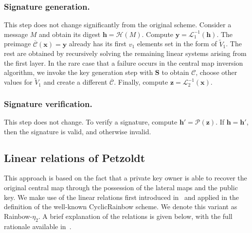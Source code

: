 \documentclass[12pt, a4paper, oneside]{memoir}
\theoremstyle{definition}
\begin{document}
\subsubsection{Signature generation.}

This step does not change significantly from the original scheme. Consider a message $M$ and obtain its digest $\mathbf{h} = \mathcal{H}(M)$. Compute $\mathbf{y} = \mathcal{L}_{1}^{-1}(\mathbf{h})$. The preimage $\overline{\mathcal{C}}(\mathbf{x}) = \mathbf{y}$ already has its first $v_{1}$ elements set in the form of $\widetilde{V}_{1}$. The rest are obtained by recursively solving the remaining linear systems arising from the first layer. In the rare case that a failure occurs in the central map inversion algorithm, we invoke the key generation step with $\mathbf{S}$ to obtain $\mathcal{C}$, choose other values for $\widetilde{V}_{1}$ and create a different $\overline{\mathcal{C}}$. Finally, compute $\mathbf{z} = \mathcal{L}_{2}^{-1}(\mathbf{x})$.

\subsubsection{Signature verification.}

This step does not change. To verify a signature, compute $\mathbf{h'} = \mathcal{P}(\mathbf{z})$. If $\mathbf{h} = \mathbf{h'}$, then the signature is valid, and otherwise invalid.

\subsection{Linear relations of Petzoldt}\label{subsec:linear}

This approach is based on the fact that a private key owner is able to recover the original central map through the possession of the lateral maps and the public key. We make use of the linear relations first introduced in~\cite{Petzoldt:201006} and applied in the definition of the well-known CyclicRainbow scheme. We denote this variant as Rainbow-$\eta_{2}$. A brief explanation of the relations is given below, with the full rationale available in~\cite[Chap.~7]{Petzoldt:201307}. 
\end{document}
